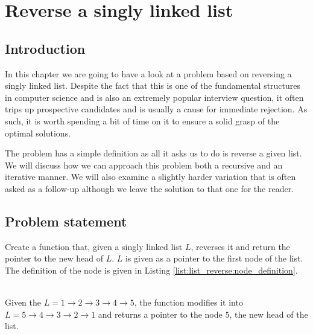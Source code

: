%

\chapter{Reverse a singly linked list}
\label{ch:list_reverse}

\section*{Introduction}
In this chapter we are going to have a look at a problem based on reversing a singly linked list. Despite the fact that this is one of the fundamental structures in computer science and is also an extremely popular interview question, it often trips up prospective candidates and is usually a cause for immediate rejection. As such, it is worth spending a bit of time on it to ensure a solid grasp of the optimal solutions. 

The problem has  a simple definition as all it asks us to do is reverse a given list.
We will discuss how we can approach this problem both a recursive and an iterative
manner. We will also examine a slightly harder variation that is
often asked as a follow-up although we leave the solution to that one for the reader. 


\section{Problem statement}
\begin{exercise}
Create a function that,  given a singly linked list $L$, reverses it and return the pointer to the new
head of $L$. $L$ is given as a pointer to the first node of the list. The definition of the node is
given in Listing \ref{list:list_reverse:node_definition}.



\begin{example}
	\hfill \\
	Given the $L = 1 \rightarrow 2 \rightarrow 3 \rightarrow 4 \rightarrow 5$, the function modifies
	it into $L = 5 \rightarrow 4 \rightarrow 3 \rightarrow 2 \rightarrow 1$ and returns a pointer to
	the node $5$, the new head of the list.
\end{example}

\end{exercise}



